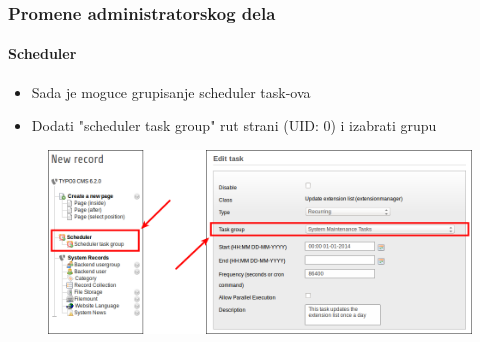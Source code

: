 \begin{frame}[fragile]
	\frametitle{Promene administratorskog dela}
	\framesubtitle{Scheduler}

	\begin{itemize}
		\item Sada je moguce grupisanje scheduler task-ova
		\item Dodati "scheduler task group" rut strani (UID: 0)\newline
			i izabrati grupu
	\end{itemize}

	\begin{figure}
		\includegraphics[width=0.85\linewidth]{Images/BackendChanges/SchedulerTaskGroup.png}
	\end{figure}

\end{frame}


